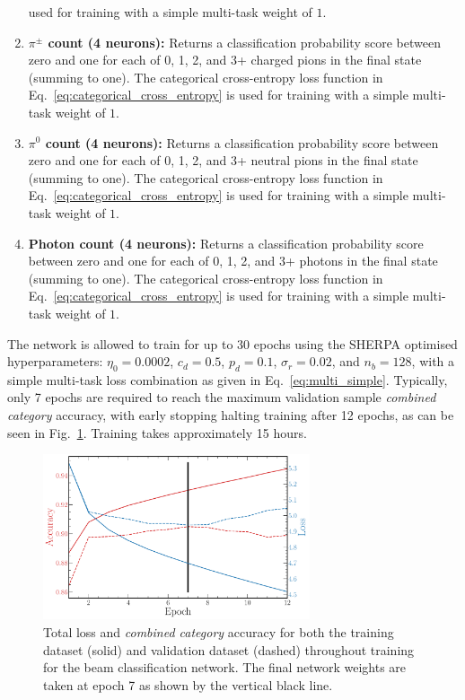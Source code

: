 \begin{enumerate}
          used for training with a simple multi-task weight of $1$.
    \item \textbf{$\pi^{\pm}$ count (4 neurons):} Returns a classification probability score
          between zero and one for each of 0, 1, 2, and 3+ charged pions in the final state
          (summing to one). The categorical cross-entropy loss function in
          Eq.~\ref{eq:categorical_cross_entropy} is used for training with a simple multi-task
          weight of $1$.
    \item \textbf{$\pi^{0}$ count (4 neurons):} Returns a classification probability score between
          zero and one for each of 0, 1, 2, and 3+ neutral pions in the final state (summing to
          one). The categorical cross-entropy loss function in
          Eq.~\ref{eq:categorical_cross_entropy} is used for training with a simple multi-task
          weight of $1$.
    \item \textbf{Photon count (4 neurons):} Returns a classification probability score between
          zero and one for each of 0, 1, 2, and 3+ photons in the final state (summing to one).
          The categorical cross-entropy loss function in Eq.~\ref{eq:categorical_cross_entropy} is
          used for training with a simple multi-task weight of $1$.
\end{enumerate}

The network is allowed to train for up to 30 epochs using the SHERPA optimised hyperparameters:
$\eta_{0}=0.0002$, $c_{d}=0.5$, $p_{d}=0.1$, $\sigma_{r}=0.02$, and $n_{b}=128$, with a simple
multi-task loss combination as given in Eq.~\ref{eq:multi_simple}. Typically, only 7 epochs are
required to reach the maximum validation sample \emph{combined category} accuracy, with early
stopping halting training after 12 epochs, as can be seen in Fig.~\ref{fig:final_beam_history}.
Training takes approximately 15 hours.

\begin{figure} %
    \includegraphics[width=0.7\textwidth]{diagrams/6-cvn/chipsnet/final_beam_history.pdf}
    \caption[Loss and accuracy throughout training for the beam classification network.]
    {Total loss and \emph{combined category} accuracy for both the training dataset (solid) and
        validation dataset (dashed) throughout training for the beam classification network. The
        final network weights are taken at epoch 7 as shown by the vertical black line.}
    \label{fig:final_beam_history}
\end{figure}

